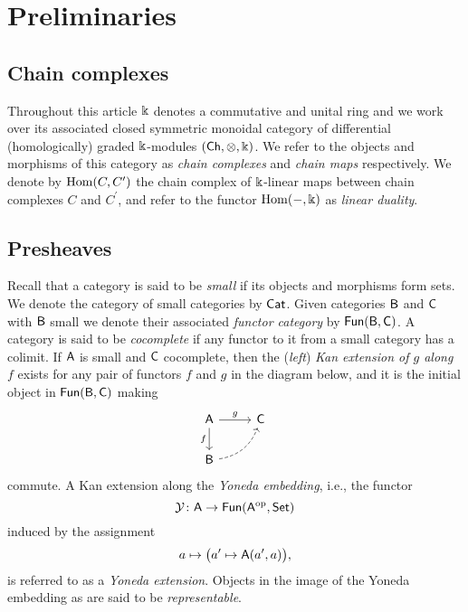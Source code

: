 
\section{Preliminaries}\label{s:preliminaries}

\subsection{Chain complexes}

Throughout this article $\Bbbk$ denotes a commutative and unital ring and we work over its associated closed symmetric monoidal category of differential (homologically) graded $\Bbbk$-modules $(\mathsf{Ch}, \otimes, \Bbbk)$.
We refer to the objects and morphisms of this category as \textit{chain complexes} and \textit{chain maps} respectively.
We denote by $\mathrm{Hom}(C, C^\prime)$ the chain complex of $\Bbbk$-linear maps between chain complexes $C$ and $C^\prime$, and refer to the functor $\mathrm{Hom}(-, \Bbbk)$ as \textit{linear duality}.

\subsection{Presheaves}

Recall that a category is said to be \textit{small} if its objects and morphisms form sets.
We denote the category of small categories by $\mathsf{Cat}$.
Given categories $\mathsf{B}$ and $\mathsf{C}$ with $\mathsf{B}$ small we denote their associated \textit{functor category} by $\mathsf{Fun}(\mathsf{B}, \mathsf{C})$.
A category is said to be \textit{cocomplete} if any functor to it from a small category has a colimit.
If $\mathsf{A}$ is small and $\mathsf{C}$ cocomplete, then the (\textit{left}) \textit{Kan extension of $g$ along $f$} exists for any pair of functors $f$ and $g$ in the diagram below, and it is the initial object in $\mathsf{Fun}(\mathsf{B}, \mathsf{C})$ making
\begin{equation*}
\begin{tikzcd}[column sep=normal, row sep=normal]
\sA \arrow[d, "f"'] \arrow[r, "g"] & \sC \\
\sB \arrow[dashed, ur, bend right] & \quad
\end{tikzcd}
\end{equation*}
commute.
A Kan extension along the \textit{Yoneda embedding}, i.e., the functor
\[
\operatorname{\mathcal{Y}} \colon \mathsf{A} \to \mathsf{Fun}(\mathsf{A}^{\mathrm{op}}, \mathsf{Set})
\]
induced by the assignment
\[
a \mapsto \big( a^\prime \mapsto \mathsf{A}(a^\prime, a) \big),
\]
is referred to as a \textit{Yoneda extension}.
Objects in the image of the Yoneda embedding as are said to be \textit{representable}.


